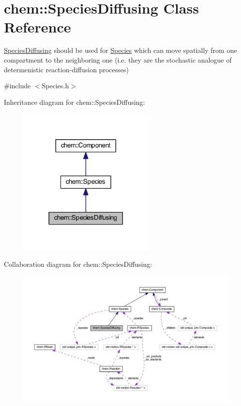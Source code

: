 \hypertarget{classchem_1_1SpeciesDiffusing}{\section{chem\-:\-:Species\-Diffusing Class Reference}
\label{classchem_1_1SpeciesDiffusing}
}


\hyperlink{classchem_1_1SpeciesDiffusing}{Species\-Diffusing} should be used for \hyperlink{classchem_1_1Species}{Species} which can move spatially from one compartment to the neighboring one (i.\-e. they are the stochastic analogue of determenistic reaction-\/diffusion processes)  




{\ttfamily \#include $<$Species.\-h$>$}



Inheritance diagram for chem\-:\-:Species\-Diffusing\-:\nopagebreak
\begin{figure}[H]
\begin{center}
\leavevmode
\includegraphics[width=194pt]{classchem_1_1SpeciesDiffusing__inherit__graph}
\end{center}
\end{figure}


Collaboration diagram for chem\-:\-:Species\-Diffusing\-:\nopagebreak
\begin{figure}[H]
\begin{center}
\leavevmode
\includegraphics[width=350pt]{classchem_1_1SpeciesDiffusing__coll__graph}
\end{center}
\end{figure}
